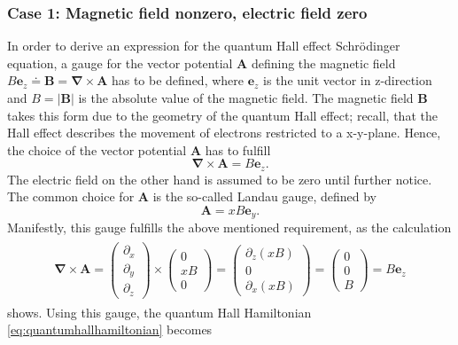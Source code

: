 \documentclass{report}
\numberwithin{tm}{section}
\newcommand\vect[1]{\ensuremath{\bm{#1}}}
\begin{document}
\subsubsection{Case 1: Magnetic field nonzero, electric field zero}
In order to derive an expression for the quantum Hall effect Schrödinger equation, a gauge for the vector potential $\vect{A}$ defining the magnetic field $B\vect{e}_z \doteq \vect{B} = \vect{\nabla} \times \vect{A}$ has to be defined, where $\vect{e}_z$ is the unit vector in z-direction and $B = |\vect{B}|$ is the absolute value of the magnetic field. The magnetic field $\vect{B}$ takes this form due to the geometry of the quantum Hall effect; recall, that the Hall effect describes the movement of electrons restricted to a x-y-plane. Hence, the choice of the vector potential $\vect{A}$ has to fulfill \begin{equation}
	\vect{\nabla} \times \vect{A} = B \vect{e}_z.
\end{equation} The electric field on the other hand is assumed to be zero until further notice. The common choice for $\vect{A}$ is the so-called Landau gauge, defined by \begin{equation}
\vect{A} = xB\vect{e}_y.
\end{equation} Manifestly, this gauge fulfills the above mentioned requirement, as the calculation \begin{align}
\begin{aligned}
	\vect{\nabla}\times \vect{A} = \begin{pmatrix}
		\partial_x \\ \partial_y \\ \partial_z
	\end{pmatrix} \times \begin{pmatrix}
	0 \\ xB \\ 0
	\end{pmatrix} = \begin{pmatrix}
	\partial_z(xB) \\ 0 \\ \partial_x (xB)
	\end{pmatrix} = \begin{pmatrix}
	0 \\ 0 \\ B
	\end{pmatrix} = B\vect{e}_z
\end{aligned}
\end{align} shows. Using this gauge, the quantum Hall Hamiltonian \cref{eq:quantumhallhamiltonian} becomes \begin{align}\begin{aligned}\label{eq:quantumhallhamiltonian_landau_gauge}

\end{aligned}
\end{align}
\end{document}
